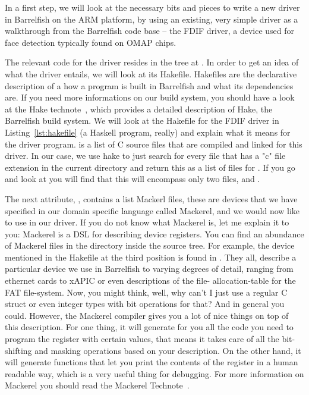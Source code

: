 \documentclass[a4paper,11pt,twoside]{report}
\begin{document}
In a first step, we will look at the necessary bits and pieces to write a new
driver in Barrelfish on the ARM platform, by using an existing, very simple
driver as a walkthrough from the Barrelfish code base -- the FDIF driver, a
device used for face detection typically found on OMAP chips.

The relevant code for the driver resides in the tree at
. In order to get an idea of what the
driver entails, we will look at its Hakefile. Hakefiles are the declarative
description of a how a program is built in Barrelfish and what its
dependencies are. If you need more informations on our build system, you
should have a look at the Hake technote~\cite{btn003-hake}, which provides a
detailed description of Hake, the Barrelfish build system. We will look at the
Hakefile for the FDIF driver in Listing~\ref{lst:hakefile} (a Haskell program,
really) and explain what it means for the driver program.  is
a list of C source files that are compiled and linked for this driver. In our
case, we use hake to just search for every file that has a "c" file extension
in the current directory and return this as a list of files for
. If you go and look at 
you will find that this will encompass only two files,  and
.

The next attribute, , contains a list Mackerl files,
these are devices that we have specified in our domain specific language
called Mackerel, and we would now like to use in our driver. If you do not
know what Mackerel is, let me explain it to you: Mackerel is a DSL for
describing device registers. You can find an abundance of Mackerel files in
the  directory inside the source tree. For example, the
 device mentioned in the Hakefile at the third
position is found in . They all,
describe a particular device we use in Barrelfish to varying degrees of
detail, ranging from ethernet cards to xAPIC or even descriptions of the file-
allocation-table for the FAT file-system. Now, you might think, well, why
can't I just use a regular C struct or even integer types with bit operations
for that? And in general you could. However, the Mackerel compiler gives you a
lot of nice things on top of this description. For one thing, it will generate
for you all the code you need to program the register with certain values,
that means it takes care of all the bit-shifting and masking operations based
on your description. On the other hand, it will generate functions that let
you print the contents of the register in a human readable way, which is a
very useful thing for debugging. For more information on Mackerel you should
read the Mackerel Technote~\cite{btn002-mackerel}.
\end{document}
